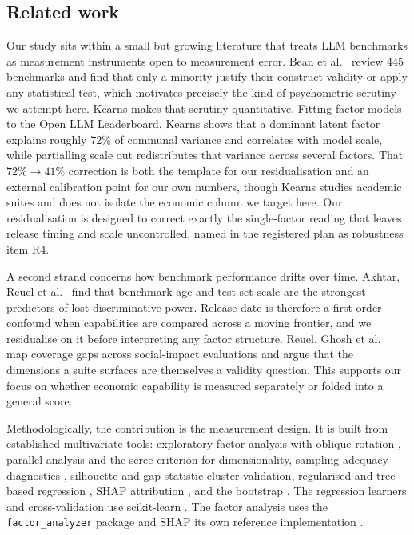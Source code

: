 \subsection{Related work}\label{sec:related}
Our study sits within a small but growing literature that treats LLM benchmarks as measurement
instruments open to measurement error. Bean et al.\ \cite{bean2025} review 445 benchmarks and
find that only a minority justify their construct validity or apply any statistical test, which
motivates precisely the kind of psychometric scrutiny we attempt here. Kearns \cite{kearns2026} makes that scrutiny quantitative. Fitting factor models to the Open LLM Leaderboard, Kearns shows that a dominant latent factor explains roughly 72\% of communal variance and correlates with model scale, while
partialling scale out redistributes that variance across several factors. That $72\%\rightarrow41\%$
correction is both the template for our residualisation and an external calibration
point for our own numbers, though Kearns studies academic suites and does not isolate
the economic column we target here. Our residualisation is designed to correct exactly the single-factor
reading that leaves release timing and scale uncontrolled, named in the registered plan as robustness item R4.

A second strand concerns how benchmark performance drifts over time. Akhtar, Reuel et al.\
\cite{akhtar2026} find that benchmark age and test-set scale are the strongest predictors of lost
discriminative power. Release date is therefore a first-order confound
when capabilities are compared across a moving frontier, and we residualise on
it before interpreting any factor structure. Reuel, Ghosh et al.\ \cite{reuel2026} map
coverage gaps across social-impact evaluations and argue that the dimensions a suite surfaces are
themselves a validity question. This supports our focus on whether economic capability is measured
separately or folded into a general score.

Methodologically, the contribution is the measurement design. It is built from established multivariate tools: exploratory factor analysis
with oblique rotation \cite{thurstone1947}, parallel analysis \cite{horn1965} and the scree criterion
\cite{cattell1966} for dimensionality, sampling-adequacy diagnostics \cite{kaiser1974,bartlett1950},
silhouette \cite{rousseeuw1987} and gap-statistic \cite{tibshirani2001gap} cluster validation,
regularised and tree-based regression \cite{hoerl1970,zou2005,breiman2001,friedman2001}, SHAP
attribution \cite{lundberg2017}, and the bootstrap \cite{efron1993}. The regression learners and
cross-validation use scikit-learn \cite{pedregosa2011}. The factor analysis uses the
\texttt{factor\_analyzer} package and SHAP its own reference implementation \cite{lundberg2017}.

